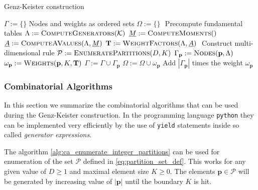 \documentclass[a4paper,10pt]{article}
\begin{document}

\begin{algorithm}[h!]
  \caption{Genz-Keister construction}
  \label{alg:gk_construction}
  \begin{algorithmic}
      \State $\Gamma := \{\}$
      \Comment Nodes and weights as ordered sets
      \State $\Omega := \{\}$
      \State $ $
      \Comment Precompute fundamental tables
      \State $\Lambda := \textsc{ComputeGenerators}(\mathcal{K})$
      \State $\vec{M} := \textsc{ComputeMoments}()$
      \State $\vec{A} := \textsc{ComputeAValues}(\Lambda, \vec{M})$
      \State $\mat{T} := \textsc{WeightFactors}(\Lambda, \vec{A})$
      \State $ $
      \Comment Construct multi-dimensional rule
      \State $\mathcal{P} := \textsc{EnumeratePartitions}(D, K)$
          \State $\Gamma_\mathbf{p} := \textsc{Nodes}(\mathbf{p}, \Lambda)$
          \State $\omega_\mathbf{p} := \textsc{Weights}(\mathbf{p}, K, \mat{T})$
          \State $\Gamma := \Gamma \cup \Gamma_\mathbf{p}$
          \State $\Omega := \Omega \cup \omega_\mathbf{p}$
          \Comment Add $|\Gamma_\mathbf{p}|$ times the weight $\omega_\mathbf{p}$
        \EndIf
      \EndFor
    \EndProcedure
  \end{algorithmic}
\end{algorithm}


\subsubsection{Combinatorial Algorithms}


In this section we summarize the combinatorial algorithms that
can be used during the Genz-Keister construction. In the programming
language \texttt{python} they can be implemented very efficiently by
the use of \texttt{yield} statements inside so called \emph{generator expressions}.

The algorithm \eqref{alg:ca_enumerate_integer_partitions} can
be used for enumeration of the set $\mathcal{P}$ defined in
\eqref{eq:partition_set_def}. This works for any given value
of $D \geq 1$ and maximal element size $K \geq 0$. The elements
$\mathbf{p} \in \mathcal{P}$ will be generated by increasing value
of $|\mathbf{p}|$ until the boundary $K$ is hit.

\end{document}
